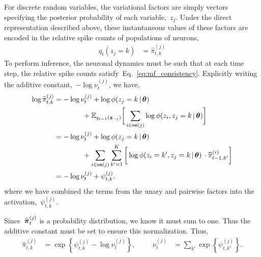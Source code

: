 For discrete random variables, the variational factors are simply
vectors specifying the posterior probability of each variable,~$z_j$.
Under the direct representation described above, these instantaneous
values of these factors are encoded in the relative spike counts of
populations of neurons,
\begin{align*}
  q_t(z_j=k) &= \widehat{\pi}_{t,k}^{(j)} 
\end{align*}
To perform inference, the neuronal dynamics must be such that at each
time step, the relative spike counts satisfy~Eq.~\ref{eq:mf_consistency}. 
Explicitly writing the additive constant,~$-\log \nu_t^{(j)}$, we have,
\begin{align}
  \nonumber
  \log \widehat{\pi}_{t,k}^{(j)} 
  &= -\log \nu_t^{(j)} + \log \phi(z_j=k \,|\, \boldsymbol{\theta}) \\
  &\hspace{4em} + \mathbb{E}_{q_{t-1}(\boldsymbol{z}_{\neg j})} \bigg[
  \sum_{i \in \mathsf{ne}(j)} \log \phi(z_{i}, z_j=k \,|\, \boldsymbol{\theta}) \bigg] \\
  & \nonumber = 
     - \log \nu_t^{(j)} + \log \phi(z_j=k \,|\, \boldsymbol{\theta}) \\
  & \label{eq:variational_rate}
  \hspace{4em} + \sum_{i \in \mathsf{ne}(j)} \sum_{k'=1}^K
  \bigg[\log \phi(z_{i}=k', z_j=k \,|\, \boldsymbol{\theta}) \,\cdot  \widehat{\pi}_{t-1,k'}^{(i)} \bigg] \\
  &= -\log \nu_t^{(j)} + \psi_{t,k}^{(j)}.
\end{align}
where we have combined the terms from the unary and pairwise factors
into the activation,~$\psi_{t,k}^{(j)}$.

Since~$\widehat{\boldsymbol{\pi}}_{t}^{(j)}$ is a probability distribution, we
know it must sum to one. Thus the additive constant must be set to
ensure this normalization.  Thus,
\begin{align*}
  \widehat{\pi}_{t,k}^{(j)} &=
  \exp \left \{\psi_{t,k}^{(j)} -\log \nu_{t}^{(j)} \right \},
  & & &
  \nu_t^{(j)} &= \sum_{k'} \exp \left \{\psi_{t,k'}^{(j)} \right \}.
\end{align*}


